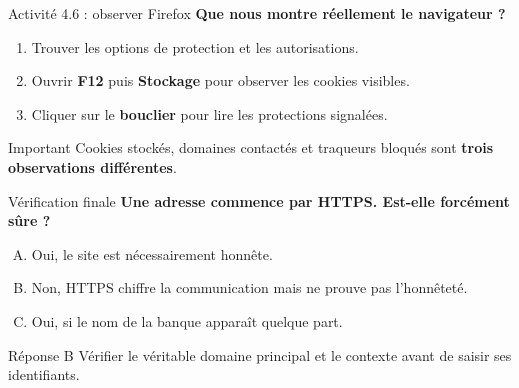 \documentclass[aspectratio=169,11pt]{beamer}
\newcommand{\question}[1]{{\Large\color{or}\bfseries #1}}
\begin{document}
\begin{frame}{Activité 4.6 : observer Firefox}
\question{Que nous montre réellement le navigateur ?}
\vspace{6mm}
\begin{enumerate}\setlength{\itemsep}{6mm}
\item Trouver les options de protection et les autorisations.
\item Ouvrir \textbf{F12} puis \textbf{Stockage} pour observer les cookies visibles.
\item Cliquer sur le \textbf{bouclier} pour lire les protections signalées.
\end{enumerate}
\vspace{4mm}
\pause
\begin{block}{Important}
Cookies stockés, domaines contactés et traqueurs bloqués sont \textbf{trois observations différentes}.
\end{block}
\end{frame}

\begin{frame}{Vérification finale}
\question{Une adresse commence par HTTPS. Est-elle forcément sûre ?}
\vspace{5mm}
\begin{enumerate}[A.]\setlength{\itemsep}{6mm}
\item Oui, le site est nécessairement honnête.
\item Non, HTTPS chiffre la communication mais ne prouve pas l'honnêteté.
\item Oui, si le nom de la banque apparaît quelque part.
\end{enumerate}
\pause
\vspace{5mm}
\begin{block}{Réponse B}
Vérifier le véritable domaine principal et le contexte avant de saisir ses identifiants.
\end{block}
\end{frame}
\end{document}

